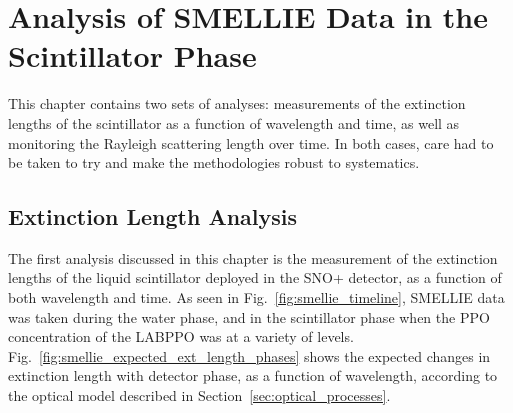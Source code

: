 \chapter{Analysis of SMELLIE Data in the Scintillator Phase}\label{chap:smellie_analysis}

This chapter contains two sets of analyses: measurements of the extinction lengths of the scintillator as a function of wavelength and time, as well as monitoring the Rayleigh scattering length over time. In both cases, care had to be taken to try and make the methodologies robust to systematics.

\section{Extinction Length Analysis}\label{sec:ext_length_analysis}
The first analysis discussed in this chapter is the measurement of the extinction lengths of the liquid scintillator deployed in the SNO+ detector, as a function of both wavelength and time. As seen in Fig.~\ref{fig:smellie_timeline}, SMELLIE data was taken during the water phase, and in the scintillator phase when the PPO concentration of the LABPPO was at a variety of levels. Fig.~\ref{fig:smellie_expected_ext_length_phases} shows the expected changes in extinction length with detector phase, as a function of wavelength, according to the optical model described in Section~\ref{sec:optical_processes}.

